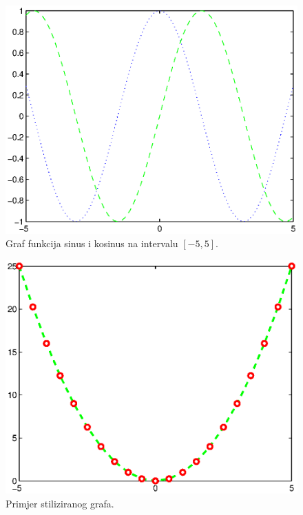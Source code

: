 \documentclass[a4paper, 10pt]{article}
\begin{document}
\begin{figure}[!htb]
\centering
\includegraphics[width=\linewidth]{slike/plot_sin_cos_1.eps}
\caption{Graf funkcija sinus i kosinus na intervalu $[-5, 5]$.}
\label{fig:plot_sin_cos_1}
\end{figure}

\begin{figure}[!htb]
\centering
\includegraphics[width=\linewidth]{slike/plot_stil.eps}
\caption{Primjer stiliziranog grafa.}
\label{fig:plot_stil}
\end{figure}
\end{document}
